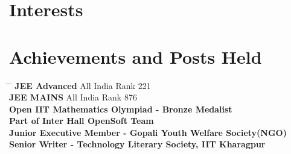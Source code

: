 \documentclass[10pt]{article} %
\begin{document}
\section{Interests}



\section{Achievements and Posts Held}

\parbox{0.5\textwidth}{ %
\begin{tabbing}
\hspace{2.75cm} \= \hspace{4cm} \= \kill %
{\bf JEE Advanced} \> All India Rank 221\\ %
{\bf JEE MAINS} \> All India Rank 876\\ %
{\bf Open IIT Mathematics Olympiad - Bronze Medalist} \>  \\ %
{\bf Part of Inter Hall OpenSoft Team} \>{} \\%
{\bf Junior Executive Member - Gopali Youth Welfare Society(NGO) }\\
{\bf Senior Writer - Technology Literary Society, IIT Kharagpur}
\end{tabbing}}

\end{document}
